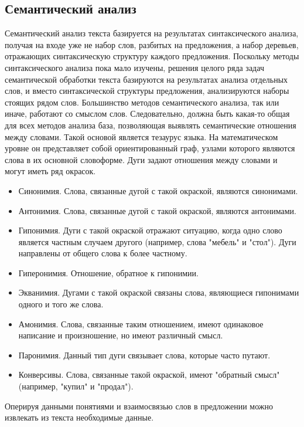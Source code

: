 \subsection{Семантический анализ}
Семантический анализ текста базируется на результатах синтаксического анализа, получая на входе уже не набор слов, разбитых на предложения, а набор деревьев, отражающих синтаксическую структуру каждого предложения. Поскольку методы синтаксического анализа пока мало изучены, решения целого ряда задач семантической обработки текста базируются на результатах анализа отдельных слов, и вместо синтаксической структуры предложения, анализируются наборы стоящих рядом слов.
Большинство методов семантического анализа, так или иначе, работают со смыслом слов. Следовательно, должна быть какая-то общая для всех методов анализа база, позволяющая выявлять семантические отношения между словами. Такой основой является тезаурус языка. На математическом уровне он представляет собой ориентированный граф, узлами которого являются слова в их основной словоформе. Дуги задают отношения между словами и могут иметь ряд окрасок.\\
\begin{itemize}
\item Синонимия. Слова, связанные дугой с такой окраской, являются синонимами.
\item Антонимия. Слова, связанные дугой с такой окраской, являются антонимами.
\item Гипонимия. Дуги с такой окраской отражают ситуацию, когда одно слово является частным случаем другого (например, слова "мебель" и "стол"). Дуги направлены от общего слова к более частному.
\item Гиперонимия. Отношение, обратное к гипонимии.
\item Экванимия. Дугами с такой окраской связаны слова, являющиеся гипонимами одного и того же слова.
\item Амонимия. Слова, связанные таким отношением, имеют одинаковое написание и произношение, но имеют различный смысл.
\item Паронимия. Данный тип дуги связывает слова, которые часто путают.
\item Конверсивы. Слова, связанные такой окраской, имеют "обратный смысл" (например, "купил" и "продал").
\end{itemize}
\cite{Kling}
Оперируя данными понятиями и взаимосвязью слов в предложении можно извлекать из текста необходимые данные.
